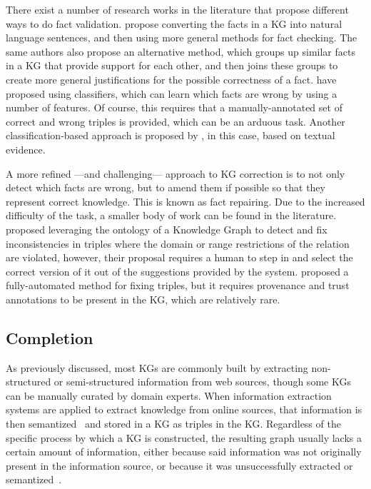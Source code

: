 There exist a number of research works in the literature that propose different ways to do fact validation. \citet{pasternack2010} propose converting the facts in a KG into natural language sentences, and then using more general methods for fact checking. The same authors \cite{pasternack2011} also propose an alternative method, which groups up similar facts in a KG that provide support for each other, and then joins these groups to create more general justifications for the possible correctness of a fact. \citet{gerber2015} have proposed using classifiers, which can learn which facts are wrong by using a number of features. Of course, this requires that a manually-annotated set of correct and wrong triples is provided, which can be an arduous task. Another classification-based approach is proposed by \citet{syed2018}, in this case, based on textual evidence.

A more refined ---and challenging--- approach to KG correction is to not only detect which facts are wrong, but to amend them if possible so that they represent correct knowledge. This is known as fact repairing. Due to the increased difficulty of the task, a smaller body of work can be found in the literature. \citet{topper2012} proposed leveraging the ontology of a Knowledge Graph to detect and fix inconsistencies in triples where the domain or range restrictions of the relation are violated, however, their proposal requires a human to step in and select the correct version of it out of the suggestions provided by the system. \citet{bonatti2011} proposed a fully-automated method for fixing triples, but it requires provenance and trust annotations to be present in the KG, which are relatively rare.

\subsection{Completion}
As previously discussed, most KGs are commonly built by extracting non-structured or semi-structured information from web sources, though some KGs can be manually curated by domain experts. When information extraction systems are applied to extract knowledge from online sources, that information is then semantized~\cite{ayala2018, neumaier2016} and stored in a KG as triples in the KG. Regardless of the specific process by which a KG is constructed, the resulting graph usually lacks a certain amount of information, either because said information was not originally present in the information source, or because it was unsuccessfully extracted or semantized~\cite{bordes2014b}. 

